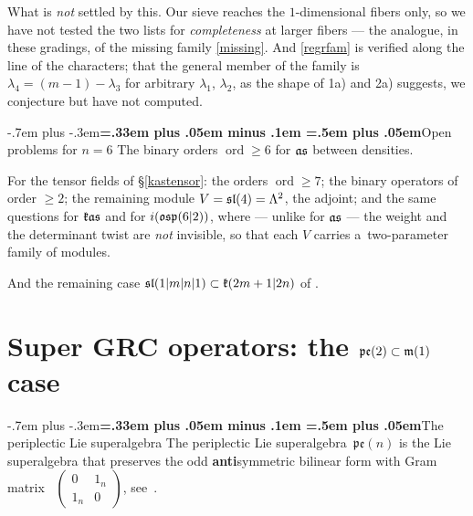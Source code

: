 \documentclass[12pt,a4paper]{amsart}
\makeatletter
\providecommand{\headspaces}{\spaceskip=.33em plus .05em minus .1em \xspaceskip=.5em plus .05em}
\def\subsection{\@startsection{subsection}{2}{0pt}{-1ex \@plus -.4ex \@minus -.2ex}%
  {-.7em plus -.3em}{\normalfont\normalsize\bfseries\boldmath\headspaces}}
\theoremstyle{thm}
\theoremstyle{definition}
\let\ssec\subsection
\newcommand {\Nord}{\operatorname{ord}}   %
\makeatother
\begin{document}
What is \textit{not} settled by this. Our sieve reaches the $1$-dimensional fibers only, so
we have not tested the two lists for \textit{completeness} at larger fibers --- the
analogue, in these gradings, of the missing family \eqref{missing}. And \eqref{regrfam} is
verified along the line of the characters; that the general member of the family is
$\lambda_4=(m-1)-\lambda_3$ for arbitrary $\lambda_1$, $\lambda_2$, as the shape of
1a) and 2a) suggests, we conjecture but have not computed.

\ssec{Open problems for $n=6$}\label{kasopen}
The binary orders $\Nord\geq6$ for ${\mathfrak{as}}$ between densities.

For the tensor fields of \S\ref{kastensor}: the orders $\Nord\geq7$; the binary operators
of order $\geq2$; the remaining module
$V={\mathfrak{sl}}(4)=\Lambda^2$, the adjoint; and the same questions for ${\mathfrak{k}}{\mathfrak{as}}$ and for
$i({\mathfrak{osp}}(6|2))$, where --- unlike for ${\mathfrak{as}}$ --- the weight and the determinant twist are
\textit{not} invisible, so that each $V$ carries a~two-parameter family of modules.

And the remaining case ${\mathfrak{sl}}(1|m|n|1)\subset{\mathfrak{k}}(2m+1|2n)$ of \cite[Table~(4)]{BLS1}.

\section{Super GRC operators: the ${\mathfrak{pe}}(2)\subset {\mathfrak{m}}(1)$ case} \label{CoRm} %

\subsection{The periplectic Lie superalgebra}
The periplectic Lie superalgebra~$\mathfrak{pe}(n)$ is the Lie superalgebra that preserves the odd \textbf{anti}symmetric bilinear form with Gram matrix~%
$\begin{pmatrix}
0& 1_n\\
1_n & 0
\end{pmatrix}$,
see~\cite{BGLLS}.
\end{document}

